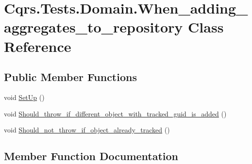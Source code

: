 \hypertarget{classCqrs_1_1Tests_1_1Domain_1_1When__adding__aggregates__to__repository}{}\section{Cqrs.\+Tests.\+Domain.\+When\+\_\+adding\+\_\+aggregates\+\_\+to\+\_\+repository Class Reference}
\label{classCqrs_1_1Tests_1_1Domain_1_1When__adding__aggregates__to__repository}
\subsection*{Public Member Functions}
\begin{DoxyCompactItemize}
\item 
void \hyperlink{classCqrs_1_1Tests_1_1Domain_1_1When__adding__aggregates__to__repository_a1a5d4bd19f137780df70bc6a4dae350c_a1a5d4bd19f137780df70bc6a4dae350c}{Set\+Up} ()
\item 
void \hyperlink{classCqrs_1_1Tests_1_1Domain_1_1When__adding__aggregates__to__repository_afc7613cfdd77c0dbbd1d3fb774a7ee3b_afc7613cfdd77c0dbbd1d3fb774a7ee3b}{Should\+\_\+throw\+\_\+if\+\_\+different\+\_\+object\+\_\+with\+\_\+tracked\+\_\+guid\+\_\+is\+\_\+added} ()
\item 
void \hyperlink{classCqrs_1_1Tests_1_1Domain_1_1When__adding__aggregates__to__repository_aeb6a64e97538f5385056ed2dfd1e3c9f_aeb6a64e97538f5385056ed2dfd1e3c9f}{Should\+\_\+not\+\_\+throw\+\_\+if\+\_\+object\+\_\+already\+\_\+tracked} ()
\end{DoxyCompactItemize}


\subsection{Member Function Documentation}
\mbox{\label{classCqrs_1_1Tests_1_1Domain_1_1When__adding__aggregates__to__repository_a1a5d4bd19f137780df70bc6a4dae350c_a1a5d4bd19f137780df70bc6a4dae350c}} 
